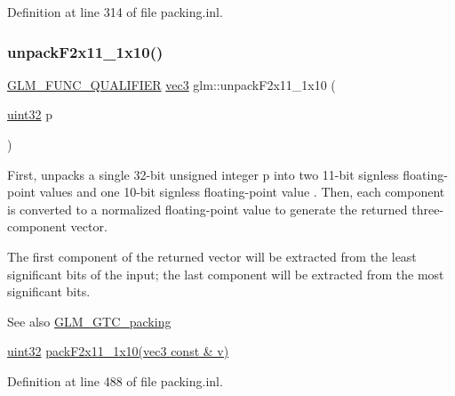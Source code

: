 Definition at line 314 of file packing.\+inl.

\mbox{\label{group__gtc__packing_ga8b9c7991eb021d95c778bf5c0b2f7824}} 
\subsubsection{\texorpdfstring{unpack\+F2x11\+\_\+1x10()}{unpackF2x11\_1x10()}}
{\footnotesize\ttfamily \hyperlink{setup_8hpp_a33fdea6f91c5f834105f7415e2a64407}{G\+L\+M\+\_\+\+F\+U\+N\+C\+\_\+\+Q\+U\+A\+L\+I\+F\+I\+ER} \hyperlink{group__core__types_ga1c47e8b3386109bc992b6c48e91b0be7}{vec3} glm\+::unpack\+F2x11\+\_\+1x10 (\begin{DoxyParamCaption}\item[{\hyperlink{group__gtc__type__precision_ga202b6a53c105fcb7e531f9b443518451}{uint32}}]{p }\end{DoxyParamCaption})}

First, unpacks a single 32-\/bit unsigned integer p into two 11-\/bit signless floating-\/point values and one 10-\/bit signless floating-\/point value . Then, each component is converted to a normalized floating-\/point value to generate the returned three-\/component vector.

The first component of the returned vector will be extracted from the least significant bits of the input; the last component will be extracted from the most significant bits.

\begin{DoxySeeAlso}{See also}
\hyperlink{group__gtc__packing}{G\+L\+M\+\_\+\+G\+T\+C\+\_\+packing} 

\hyperlink{group__gtc__type__precision_ga202b6a53c105fcb7e531f9b443518451}{uint32} \hyperlink{group__gtc__packing_ga8c2a0eeee677ca4dafd9e093d9e81062}{pack\+F2x11\+\_\+1x10(vec3 const \& v)} 
\end{DoxySeeAlso}


Definition at line 488 of file packing.\+inl.

\mbox{\label{group__gtc__packing_gaa6eebcdfc746584b7d1823f1d5344fed}} 
